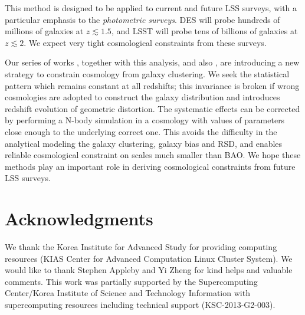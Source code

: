 \documentclass[iop]{emulateapj}
\begin{document}
This method is designed to be applied to current and future LSS surveys,
with a particular emphasis to the {\it photometric surveys}.
DES will probe hundreds of millions of galaxies at $z\lesssim1.5$, 
and LSST will probe tens of billions of galaxies at $z\lesssim2$.
We expect very tight cosmological constraints from these surveys.


Our series of works \cite{Li2014,Li2015,Li2016}, together with this analysis, 
and also \citep{topology,MS2016},
are introducing a new strategy to constrain cosmology from galaxy clustering.
We seek the statistical pattern which remains constant at all redshifts;
this invariance is broken if wrong cosmologies are adopted to construct the galaxy distribution
and introduces redshift evolution of geometric distortion.
The systematic effects can be corrected by performing a N-body simulation 
in a cosmology with values of parameters close enough to the underlying correct one.
This avoids the difficulty in the analytical modeling the galaxy clustering, galaxy bias and RSD,
and enables reliable cosmological constraint on scales much smaller than BAO.
We hope these methods play an important role in deriving cosmological constraints from future LSS surveys.

 
 
\section*{Acknowledgments}

We thank the Korea Institute for Advanced Study for providing computing resources (KIAS Center for Advanced Computation Linux Cluster System).
We would like to thank Stephen Appleby and Yi Zheng for kind helps and valuable comments.
This work was partially supported by the
Supercomputing Center/Korea Institute of Science and
Technology Information with supercomputing resources
including technical support (KSC-2013-G2-003).

\appendix

\
\end{document}
